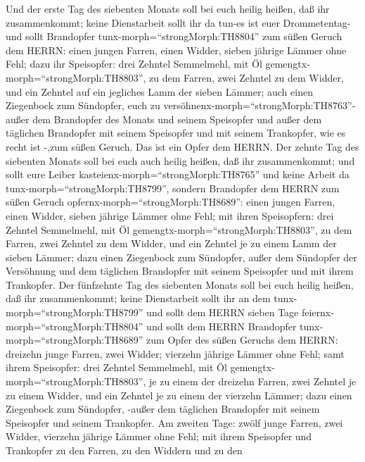  Und der erste Tag des siebenten Monats soll bei euch heilig
heißen, daß ihr zusammenkommt; keine Dienstarbeit sollt ihr da tun-es
ist euer Drommetentag-  und sollt Brandopfer
tunx-morph=``strongMorph:TH8804'' zum süßen Geruch dem HERRN: einen
jungen Farren, einen Widder, sieben jährige Lämmer ohne Fehl;
 dazu ihr Speisopfer: drei Zehntel Semmelmehl, mit Öl
gemengtx-morph=``strongMorph:TH8803'', zu dem Farren, zwei Zehntel zu
dem Widder,  und ein Zehntel auf ein jegliches Lamm der
sieben Lämmer;  auch einen Ziegenbock zum Sündopfer, euch zu
versöhnenx-morph=``strongMorph:TH8763''-  außer dem
Brandopfer des Monats und seinem Speisopfer und außer dem täglichen
Brandopfer mit seinem Speisopfer und mit seinem Trankopfer, wie es recht
ist -,zum süßen Geruch. Das ist ein Opfer dem HERRN.  Der
zehnte Tag des siebenten Monats soll bei euch auch heilig heißen, daß
ihr zusammenkommt; und sollt eure Leiber
kasteienx-morph=``strongMorph:TH8765'' und keine Arbeit da
tunx-morph=``strongMorph:TH8799'',  sondern Brandopfer dem
HERRN zum süßen Geruch opfernx-morph=``strongMorph:TH8689'': einen
jungen Farren, einen Widder, sieben jährige Lämmer ohne Fehl;
 mit ihren Speisopfern: drei Zehntel Semmelmehl, mit Öl
gemengtx-morph=``strongMorph:TH8803'', zu dem Farren, zwei Zehntel zu
dem Widder,  und ein Zehntel je zu einem Lamm der sieben
Lämmer;  dazu einen Ziegenbock zum Sündopfer, außer dem
Sündopfer der Versöhnung und dem täglichen Brandopfer mit seinem
Speisopfer und mit ihrem Trankopfer.  Der fünfzehnte Tag
des siebenten Monats soll bei euch heilig heißen, daß ihr zusammenkommt;
keine Dienstarbeit sollt ihr an dem tunx-morph=``strongMorph:TH8799''
und sollt dem HERRN sieben Tage feiernx-morph=``strongMorph:TH8804''
 und sollt dem HERRN Brandopfer
tunx-morph=``strongMorph:TH8689'' zum Opfer des süßen Geruchs dem HERRN:
dreizehn junge Farren, zwei Widder; vierzehn jährige Lämmer ohne Fehl;
 samt ihrem Speisopfer: drei Zehntel Semmelmehl, mit Öl
gemengtx-morph=``strongMorph:TH8803'', je zu einem der dreizehn Farren,
zwei Zehntel je zu einem Widder,  und ein Zehntel je zu
einem der vierzehn Lämmer;  dazu einen Ziegenbock zum
Sündopfer, -außer dem täglichen Brandopfer mit seinem Speisopfer und
seinem Trankopfer.  Am zweiten Tage: zwölf junge Farren,
zwei Widder, vierzehn jährige Lämmer ohne Fehl;  mit ihrem
Speisopfer und Trankopfer zu den Farren, zu den Widdern und zu den

